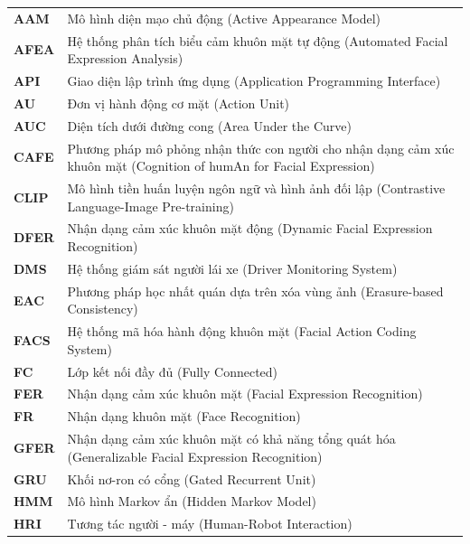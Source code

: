 \begin{longtable}{p{3.5cm} p{11.5cm}}
\rowcolor{headerblue!25}
\multicolumn{2}{l}{\bfseries\color{headerblue}
    \quad Chữ viết tắt} \\
\endfirsthead

\textbf{AAM} & Mô hình diện mạo chủ động (Active Appearance Model) \\
\textbf{AFEA} & Hệ thống phân tích biểu cảm khuôn mặt tự động (Automated Facial Expression Analysis) \\
\textbf{API} & Giao diện lập trình ứng dụng (Application Programming Interface) \\
\textbf{AU} & Đơn vị hành động cơ mặt (Action Unit) \\
\textbf{AUC} & Diện tích dưới đường cong (Area Under the Curve) \\
\textbf{CAFE} & Phương pháp mô phỏng nhận thức con người cho nhận dạng cảm xúc khuôn mặt (Cognition of humAn for Facial Expression) \\
\textbf{CLIP} & Mô hình tiền huấn luyện ngôn ngữ và hình ảnh đối lập (Contrastive Language-Image Pre-training) \\
\textbf{DFER} & Nhận dạng cảm xúc khuôn mặt động (Dynamic Facial Expression Recognition) \\
\textbf{DMS} & Hệ thống giám sát người lái xe (Driver Monitoring System) \\
\textbf{EAC} & Phương pháp học nhất quán dựa trên xóa vùng ảnh (Erasure-based Consistency) \\
\textbf{FACS} & Hệ thống mã hóa hành động khuôn mặt (Facial Action Coding System) \\
\textbf{FC} & Lớp kết nối đầy đủ (Fully Connected) \\
\textbf{FER} & Nhận dạng cảm xúc khuôn mặt (Facial Expression Recognition) \\
\textbf{FR} & Nhận dạng khuôn mặt (Face Recognition) \\
\textbf{GFER} & Nhận dạng cảm xúc khuôn mặt có khả năng tổng quát hóa (Generalizable Facial Expression Recognition) \\
\textbf{GRU} & Khối nơ-ron có cổng (Gated Recurrent Unit) \\
\textbf{HMM} & Mô hình Markov ẩn (Hidden Markov Model) \\
\textbf{HRI} & Tương tác người - máy (Human-Robot Interaction) \\

\end{longtable}
